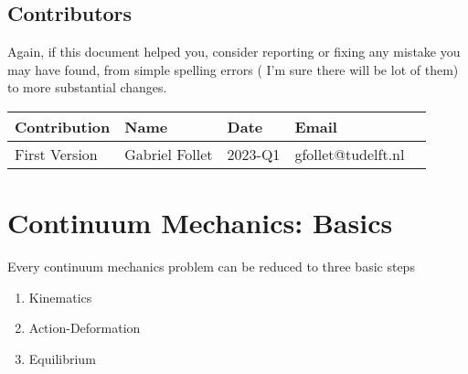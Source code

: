 \documentclass[a4paper, 11pt,article,oneside]{memoir}%
\begin{document}
\section*{Contributors}
Again, if this document helped you, consider reporting or fixing any mistake you may have found, from simple spelling errors ( I'm sure there will be  lot of them) to more substantial changes.

\begin{table}[h]
\centering
\begin{tabular}{@{}lllll@{}}
\toprule
Contribution  & Name           & Date    & Email              &  \\ \midrule
First Version & Gabriel Follet & 2023-Q1 & gfollet@tudelft.nl &  \\
\bottomrule
\end{tabular}
\end{table}
\newpage
\tableofcontents
\newpage



\chapter{Continuum Mechanics: Basics}
Every continuum mechanics problem can be reduced to three basic steps

\begin{enumerate}
\item Kinematics
\item Action-Deformation
\item Equilibrium
\end{enumerate}
	
\end{document}
